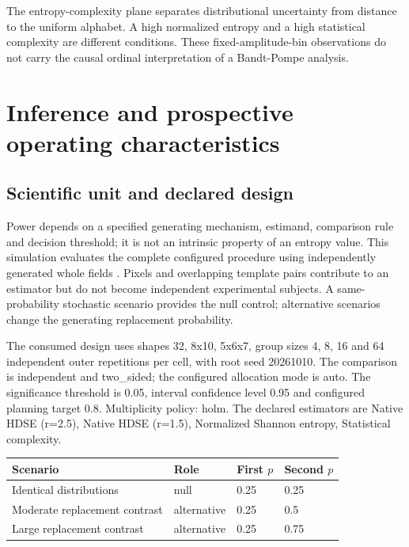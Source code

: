 \documentclass[
  english,
  11pt,
]{article}
\newcounter{none} %
\begin{document}
The entropy-complexity plane separates distributional uncertainty from
distance to the uniform alphabet. A high normalized entropy and a high
statistical complexity are different conditions. These
fixed-amplitude-bin observations do not carry the causal ordinal
interpretation of a Bandt-Pompe analysis.

\section{Inference and prospective operating
characteristics}\label{sec:power}

\subsection{Scientific unit and declared
design}\label{scientific-unit-and-declared-design}

Power depends on a specified generating mechanism, estimand, comparison
rule and decision threshold; it is not an intrinsic property of an
entropy value. This simulation evaluates the complete configured
procedure using independently generated whole fields
\citep{morris2019simulation}. Pixels and overlapping template pairs
contribute to an estimator but do not become independent experimental
subjects. A same-probability stochastic scenario provides the null
control; alternative scenarios change the generating replacement
probability.

The consumed design uses shapes 32, 8x10, 5x6x7, group sizes 4, 8, 16
and 64 independent outer repetitions per cell, with root seed 20261010.
The comparison is independent and two\_sided; the configured allocation
mode is auto. The significance threshold is 0.05, interval confidence
level 0.95 and configured planning target 0.8. Multiplicity policy:
holm. The declared estimators are Native HDSE (r=2.5), Native HDSE
(r=1.5), Normalized Shannon entropy, Statistical complexity.

{\def\LTcaptype{none} %
\begin{longtable}[]{@{}llll@{}}
\toprule\noalign{}
Scenario & Role & First \(p\) & Second \(p\) \\
\midrule\noalign{}
\endhead
\bottomrule\noalign{}
\endlastfoot
Identical distributions & null & 0.25 & 0.25 \\
Moderate replacement contrast & alternative & 0.25 & 0.5 \\
Large replacement contrast & alternative & 0.25 & 0.75 \\
\end{longtable}
}
\end{document}

